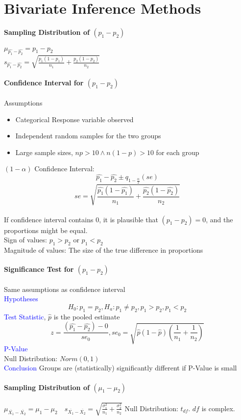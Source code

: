 \section{Bivariate Inference Methods}
\paragraph{Sampling Distribution of $(p_1-p_2)$}
$\mu_{\hat{p_1}-\hat{p_2}}=p_1-p_2$\\
$s_{\hat{p_1}-\hat{p_2}}=\sqrt{\frac{p_1(1-p_1)}{n_1}+\frac{p_2(1-p_2)}{n_2}}$\\
\paragraph{Confidence Interval for $(p_1-p_2)$}
\textcolor{Bittersweet}{Assumptions}
\begin{itemize}
	\item Categorical Response variable observed 
	\item Independent random samples for the two groups
	\item Large sample sizes, $np>10\wedge n(1-p)>10$ for each group
\end{itemize}
$(1-\alpha)$ Confidence Interval:
\[\hat{p_1}-\hat{p_2}\pm q_{1-\frac{\alpha}{2}}(se)\]
\[se=\sqrt{\frac{\hat{p_1}(1-\hat{p_1})}{n_1}+\frac{\hat{p_2}(1-\hat{p_2})}{n_2}}\]\\
If confidence interval contains 0, it is plausible that $(p_1-p_2)=0$, and the proportions might be equal.\\
Sign of values: $p_1>p_2\text{ or }p_1<p_2$\\
Magnitude of values: The size of the true difference in proportions
\paragraph{Significance Test for $(p_1-p_2)$}
Same \textcolor{Bittersweet}{assumptions} as confidence interval\\
\textcolor{Blue}{Hypotheses}
\[H_0\colon p_1=p_2,H_a:p_1\neq p_2, p_1>p_2, p_1<p_2\]
\textcolor{Blue}{Test Statistic}, $\hat{p}$ is the pooled estimate
\[z=\frac{(\hat{p_1}-\hat{p_2})-0}{se_0},se_0=\sqrt{\hat{p}(1-\hat{p})(\frac{1}{n_1}+\frac{1}{n_2})}\]
\textcolor{Blue}{P-Value}\\
Null Distribution: $Norm(0,1)$\\
\textcolor{Blue}{Conclusion}
Groups are (statistically) significantly different if P-Value is small
\paragraph{Sampling Distribution of $(\mu_1-\mu_2)$}
$\mu_{\overline{X_1}-\overline{X_2}}=\mu_1-\mu_2\quad s_{\overline{X_1}-\overline{X_2}}=\sqrt{\frac{\sigma_1^2}{n_1}+\frac{\sigma_2^2}{n_2}}$
Null Distribution: $t_{df}$. $df$ is complex.

